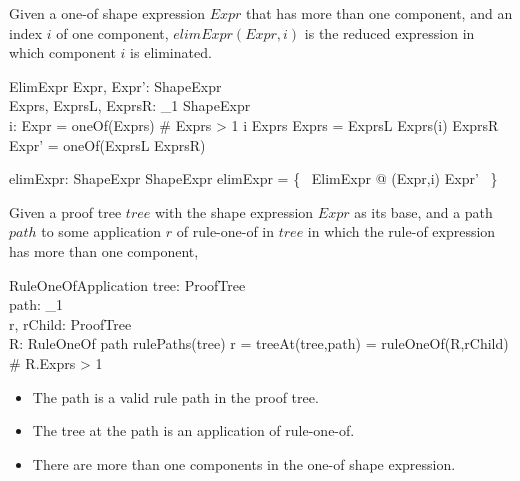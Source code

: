 \documentclass{article}
\begin{document}
Given a one-of shape expression $Expr$ that has more than one component, and an index $i$ of one component,
$elimExpr(Expr,i)$ is the reduced expression in which component $i$ is eliminated.
\begin{schema}{ElimExpr}
	Expr, Expr': ShapeExpr \\
	Exprs, ExprsL, ExprsR: \seq_1 ShapeExpr \\
	i: \nat
\where
	Expr = oneOf(Exprs)
\also
	\# Exprs > 1
\also
	i \in \dom Exprs
\also
	Exprs = ExprsL \cat \langle Exprs(i) \rangle \cat ExprsR
\also
	Expr' = oneOf(ExprsL \cat ExprsR)
\end{schema}

\begin{axdef}
	elimExpr: ShapeExpr \cross \nat \pfun ShapeExpr
\where
	elimExpr = \{~ ElimExpr @ (Expr,i) \mapsto Expr' ~\}
\end{axdef}

Given a proof tree $tree$ with the shape expression $Expr$ as its base, and a path $path$ to some application $r$ of rule-one-of in $tree$
in which the rule-of expression has more than one component,
\begin{schema}{RuleOneOfApplication}
	tree: ProofTree \\
	path: \seq \nat_1 \\
	r, rChild: ProofTree \\
	R: RuleOneOf
\where
	path \in rulePaths(tree)
\also
	r = treeAt(tree,path) = ruleOneOf(R,rChild)
\also
	\# R.Exprs > 1
\end{schema}
\begin{itemize}
\item The path is a valid rule path in the proof tree.
\item	The tree at the path is an application of rule-one-of.
\item There are more than one components in the one-of shape expression.
\end{itemize}
\end{document}
